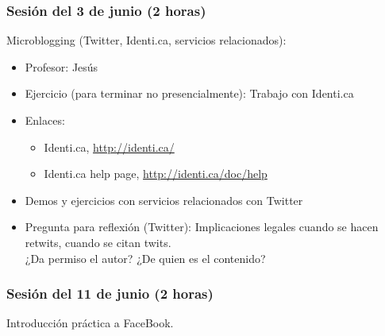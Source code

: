 \documentclass[a4paper,12pt]{article}
\begin{document}
\subsubsection{Sesión del 3 de junio (2 horas)}

Microblogging (Twitter, Identi.ca, servicios relacionados):

\begin{itemize}
\item Profesor: Jesús
\item Ejercicio (para terminar no presencialmente): Trabajo con Identi.ca
\item Enlaces:
  \begin{itemize}
  \item Identi.ca, \url{http://identi.ca/}
  \item Identi.ca help page, \url{http://identi.ca/doc/help}
  \end{itemize}
\item Demos y ejercicios con servicios relacionados con Twitter
\item Pregunta para reflexión (Twitter): Implicaciones legales cuando se hacen retwits, cuando se citan twits. \\
  ¿Da permiso el autor? ¿De quien es el contenido?
\end{itemize}

\subsubsection{Sesión del 11 de junio (2 horas)}

Introducción práctica a FaceBook.
\end{document}
